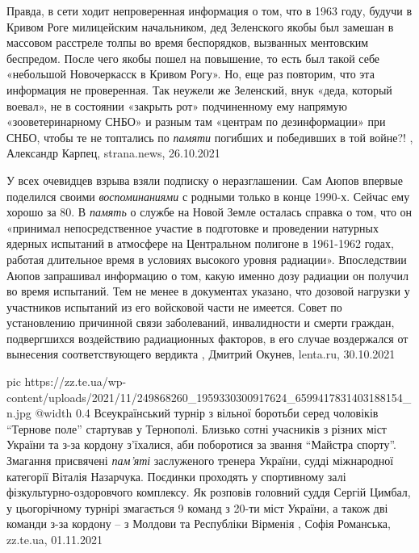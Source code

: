 Правда, в сети ходит непроверенная информация о том, что в 1963 году, будучи в
Кривом Роге милицейским начальником, дед Зеленского якобы был замешан в
массовом расстреле толпы во время беспорядков, вызванных ментовским беспредом.
После чего якобы пошел на повышение, то есть был такой себе «небольшой
Новочеркасск в Кривом Рогу». Но, еще раз повторим, что эта информация не
проверенная.  Так неужели же Зеленский, внук «деда, который воевал», не в
состоянии «закрыть рот» подчиненному ему напрямую «зооветеринарному СНБО» и
разным там «центрам по дезинформации» при СНБО, чтобы те не топтались по \emph{памяти}
погибших и победивших в той войне?!
, 
Александр Карпец, strana.news, 26.10.2021

У всех очевидцев взрыва взяли подписку о неразглашении. Сам Аюпов впервые
поделился своими \emph{воспоминаниями} с родными только в конце 1990-х. Сейчас ему
хорошо за 80. В \emph{память} о службе на Новой Земле осталась справка о том, что он
«принимал непосредственное участие в подготовке и проведении натурных ядерных
испытаний в атмосфере на Центральном полигоне в 1961-1962 годах, работая
длительное время в условиях высокого уровня радиации».
Впоследствии Аюпов запрашивал информацию о том, какую именно дозу радиации он
получил во время испытаний. Тем не менее в документах указано, что дозовой
нагрузки у участников испытаний из его войсковой части не имеется. Совет по
установлению причинной связи заболеваний, инвалидности и смерти граждан,
подвергшихся воздействию радиационных факторов, в его случае воздержался от
вынесения соответствующего вердикта
, Дмитрий Окунев, lenta.ru, 30.10.2021

\ifcmt
  pic https://zz.te.ua/wp-content/uploads/2021/11/249868260_1959330300917624_6599417831403188154_n.jpg
  @width 0.4
\fi
Всеукраїнський турнір з вільної боротьби серед чоловіків \enquote{Тернове поле}
стартував у Тернополі. Близько сотні учасників з різних міст України та з-за
кордону з’їхалися, аби поборотися за звання \enquote{Майстра спорту}.  Змагання
присвячені \emph{пам'яті} заслуженого тренера України, судді міжнародної категорії
Віталія Назарчука. Поєдинки проходять у спортивному залі
фізкультурно-оздоровчого комплексу.  Як розповів головний суддя Сергій Цимбал,
у цьогорічному турнірі змагається 9 команд з 20-ти міст України, а також дві
команди з-за кордону – з Молдови та Республіки Вірменія
, 
Софія Романська, zz.te.ua, 01.11.2021
